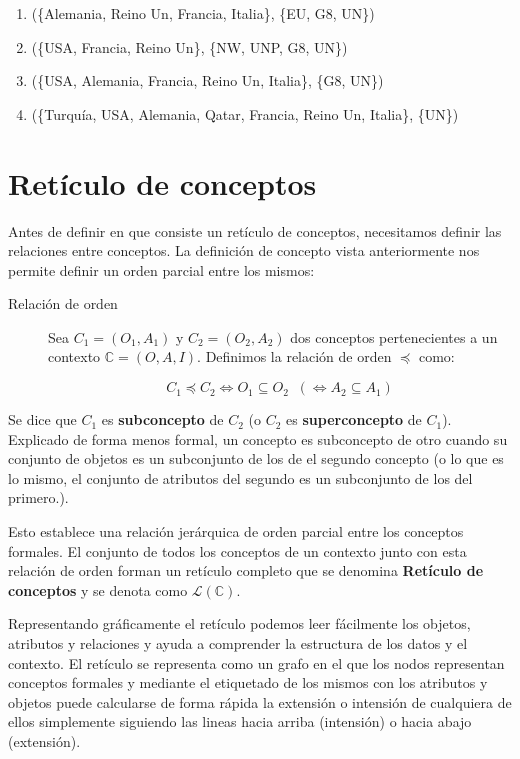 	\begin{enumerate}
		\item (\{Alemania, Reino Un, Francia, Italia\}, \{EU, G8, UN\}) 
		\item (\{USA, Francia, Reino Un\}, \{NW, UNP, G8, UN\})
		\item (\{USA, Alemania, Francia, Reino Un, Italia\}, \{G8, UN\})

		\item (\{Turquía, USA, Alemania, Qatar, Francia, Reino Un, Italia\}, \{UN\})
	\end{enumerate}
	
	
\section*{Retículo de conceptos}	

	Antes de definir en que consiste un retículo de conceptos, necesitamos definir las relaciones entre conceptos. La definición de concepto vista anteriormente nos permite definir un orden parcial entre los mismos:
	
	\begin{description}
		\item[Relación de orden] Sea $C_1 = (O_1, A_1)$ y $ C_2 = (O_2, A_2)$ dos conceptos pertenecientes a un contexto $\mathbb{C} = (O,A,I)$. Definimos la relación de orden $ \preceq $ como:
		
		\[ C_1 \preceq C_2 \Longleftrightarrow O_1 \subseteq O_2 \;\; (\Leftrightarrow A_2 \subseteq A_1 ) \]
	\end{description} 

	Se dice que $C_1$ es \textbf{subconcepto} de $C_2$ (o $C_2$ es \textbf{superconcepto} de $C_1$). Explicado de forma menos formal, un concepto es subconcepto de otro cuando su conjunto de objetos es un subconjunto de los de el segundo concepto (o lo que es lo mismo, el conjunto de atributos del segundo es un subconjunto de los del primero.). 
	
	Esto establece una relación jerárquica de orden parcial entre los conceptos formales. El conjunto de todos los conceptos de un contexto junto con esta relación de orden forman un retículo completo que se denomina \textbf{Retículo de conceptos} y se denota como $\mathcal{L}(\mathbb{C})$.
	
	Representando gráficamente el retículo podemos leer fácilmente los objetos, atributos y relaciones y ayuda a comprender la estructura de los datos y el contexto. El retículo se representa como un grafo en el que los nodos representan conceptos formales y mediante el etiquetado de los mismos con los atributos y objetos puede calcularse de forma rápida la extensión o intensión de cualquiera de ellos simplemente siguiendo las lineas hacia arriba (intensión) o hacia abajo (extensión).
	
